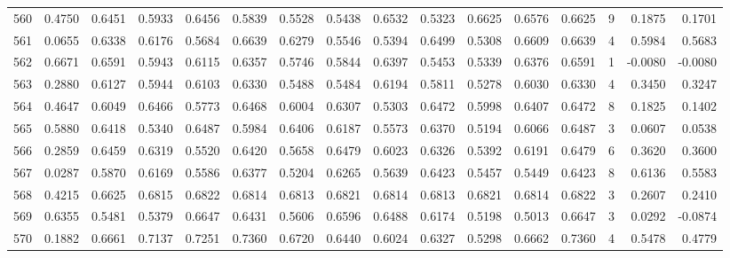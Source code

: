 \begin{tabular}{lrrrrrrrrrrrrrrr}
560 &      0.4750 &  0.6451 &  0.5933 &  0.6456 &  0.5839 &  0.5528 &  0.5438 &  0.6532 &  0.5323 &  0.6625 &   0.6576 &     0.6625 &      9 &                    0.1875 &                     0.1701 \\
561 &      0.0655 &  0.6338 &  0.6176 &  0.5684 &  0.6639 &  0.6279 &  0.5546 &  0.5394 &  0.6499 &  0.5308 &   0.6609 &     0.6639 &      4 &                    0.5984 &                     0.5683 \\
562 &      0.6671 &  0.6591 &  0.5943 &  0.6115 &  0.6357 &  0.5746 &  0.5844 &  0.6397 &  0.5453 &  0.5339 &   0.6376 &     0.6591 &      1 &                   -0.0080 &                    -0.0080 \\
563 &      0.2880 &  0.6127 &  0.5944 &  0.6103 &  0.6330 &  0.5488 &  0.5484 &  0.6194 &  0.5811 &  0.5278 &   0.6030 &     0.6330 &      4 &                    0.3450 &                     0.3247 \\
564 &      0.4647 &  0.6049 &  0.6466 &  0.5773 &  0.6468 &  0.6004 &  0.6307 &  0.5303 &  0.6472 &  0.5998 &   0.6407 &     0.6472 &      8 &                    0.1825 &                     0.1402 \\
565 &      0.5880 &  0.6418 &  0.5340 &  0.6487 &  0.5984 &  0.6406 &  0.6187 &  0.5573 &  0.6370 &  0.5194 &   0.6066 &     0.6487 &      3 &                    0.0607 &                     0.0538 \\
566 &      0.2859 &  0.6459 &  0.6319 &  0.5520 &  0.6420 &  0.5658 &  0.6479 &  0.6023 &  0.6326 &  0.5392 &   0.6191 &     0.6479 &      6 &                    0.3620 &                     0.3600 \\
567 &      0.0287 &  0.5870 &  0.6169 &  0.5586 &  0.6377 &  0.5204 &  0.6265 &  0.5639 &  0.6423 &  0.5457 &   0.5449 &     0.6423 &      8 &                    0.6136 &                     0.5583 \\
568 &      0.4215 &  0.6625 &  0.6815 &  0.6822 &  0.6814 &  0.6813 &  0.6821 &  0.6814 &  0.6813 &  0.6821 &   0.6814 &     0.6822 &      3 &                    0.2607 &                     0.2410 \\
569 &      0.6355 &  0.5481 &  0.5379 &  0.6647 &  0.6431 &  0.5606 &  0.6596 &  0.6488 &  0.6174 &  0.5198 &   0.5013 &     0.6647 &      3 &                    0.0292 &                    -0.0874 \\
570 &      0.1882 &  0.6661 &  0.7137 &  0.7251 &  0.7360 &  0.6720 &  0.6440 &  0.6024 &  0.6327 &  0.5298 &   0.6662 &     0.7360 &      4 &                    0.5478 &                     0.4779 \\

\end{tabular}
